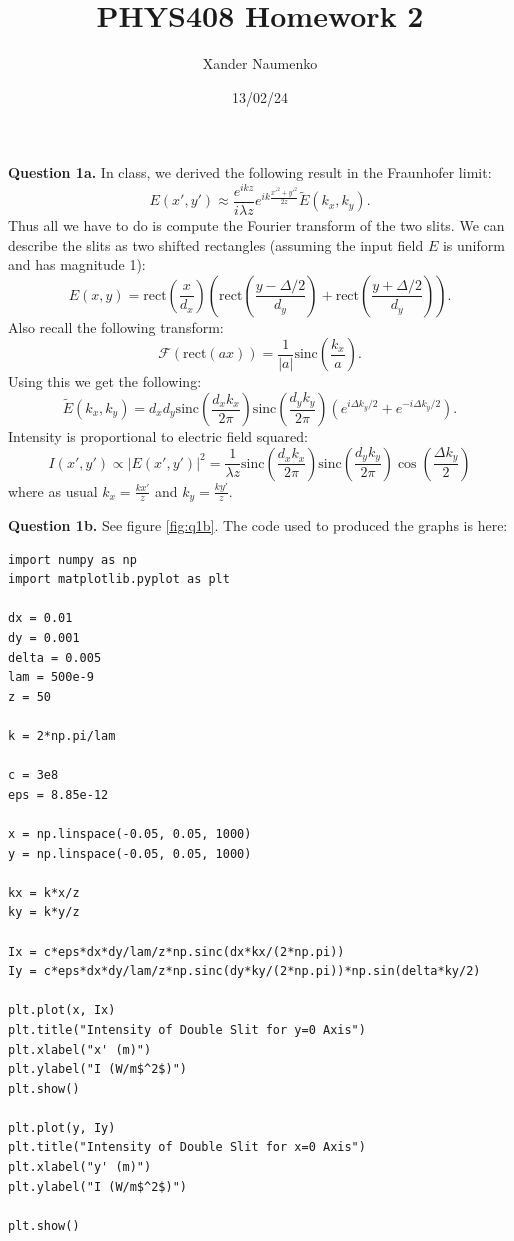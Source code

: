 \documentclass[letterpaper, reqno,11pt]{article}
\begin{document}
\title{PHYS408 Homework 2}
\date{13/02/24}
\author{Xander Naumenko}
\maketitle

{\medskip\noindent\bf Question 1a.} In class, we derived the following result in the Fraunhofer limit:
\[
    E(x',y')\approx \frac{e^{ikz}}{i\lambda z}e^{ik \frac{x'^2+y'^2}{2z}}\tilde E(k_x,k_y)
.\]
Thus all we have to do is compute the Fourier transform of the two slits. We can describe the slits as two shifted rectangles (assuming the input field $E$ is uniform and has magnitude 1):
\[
E(x,y) = \text{rect}\left(\frac{x}{d_x}\right)\left( \text{rect}\left( \frac{y-\Delta /2}{d_y} \right) +\text{rect}\left( \frac{y+\Delta /2}{d_y} \right)  \right) 
.\]
Also recall the following transform:
\[
    \mathcal F(\text{rect}(ax))=\frac{1}{|a|}\text{sinc}\left( \frac{k_x}{a} \right) 
.\]
Using this we get the following:
\[
    \tilde E(k_x, k_y) = d_xd_y \text{sinc}\left(\frac{d_xk_x}{2\pi}\right)\text{sinc}\left(\frac{d_yk_y}{2\pi}\right)\left( e^{i\Delta k_y /2}+e^{-i\Delta k_y /2} \right) 
.\]
Intensity is proportional to electric field squared:
\[
I(x',y') \propto |E(x',y')|^2=\frac{1}{\lambda z} \text{sinc}\left(\frac{d_xk_x}{2\pi}\right)\text{sinc}\left(\frac{d_yk_y}{2\pi}\right)\cos\left( \frac{\Delta k_y}{2} \right) 
\]
where as usual $k_x= \frac{kx'}{z}$ and $k_y=\frac{ky'}{z}$.

{\medskip\noindent\bf Question 1b.} See figure \ref{fig:q1b}. The code used to produced the graphs is here:
\begin{lstlisting}
import numpy as np
import matplotlib.pyplot as plt

dx = 0.01
dy = 0.001
delta = 0.005
lam = 500e-9
z = 50

k = 2*np.pi/lam

c = 3e8
eps = 8.85e-12

x = np.linspace(-0.05, 0.05, 1000)
y = np.linspace(-0.05, 0.05, 1000)

kx = k*x/z
ky = k*y/z

Ix = c*eps*dx*dy/lam/z*np.sinc(dx*kx/(2*np.pi))
Iy = c*eps*dx*dy/lam/z*np.sinc(dy*ky/(2*np.pi))*np.sin(delta*ky/2)

plt.plot(x, Ix)
plt.title("Intensity of Double Slit for y=0 Axis")
plt.xlabel("x' (m)")
plt.ylabel("I (W/m$^2$)")
plt.show()

plt.plot(y, Iy)
plt.title("Intensity of Double Slit for x=0 Axis")
plt.xlabel("y' (m)")
plt.ylabel("I (W/m$^2$)")

plt.show()

\end{lstlisting}
\end{document}
